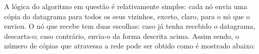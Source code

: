 
A lógica do algoritmo em questão é relativamente simples: cada nó envia uma cópia
do datagrama para todos os seus vizinhos, exceto, claro, para o nó que o enviou.
O nó que recebe tem duas escolhas: caso já tenha recebido o datagrama, descarta-o;
caso contrário, envia-o da forma descrita acima. Assim sendo, o número de cópias
que atravessa a rede pode ser obtido como é mostrado abaixo:

\begin{figure}[H]
  \centering
  
\end{figure}
